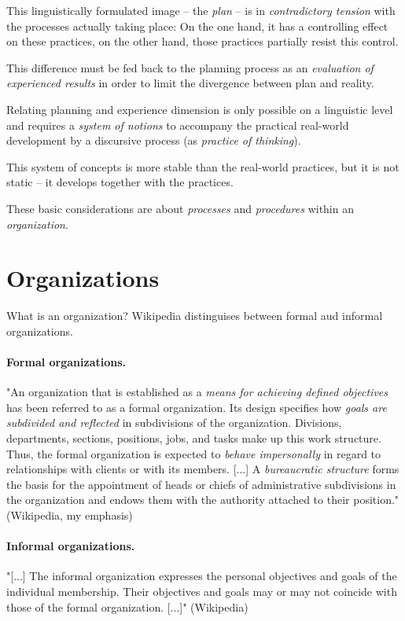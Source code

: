 \documentclass[11pt,a4paper]{article}
\begin{document}
This linguistically formulated image -- the \emph{plan} -- is in
\emph{contradictory tension} with the processes actually taking place: On the
one hand, it has a controlling effect on these practices, on the other hand,
those practices partially resist this control.\enlargethispage{1em}

This difference must be fed back to the planning process as an
\emph{evaluation of experienced results} in order to limit the divergence
between plan and reality.

Relating planning and experience dimension is only possible on a linguistic
level and requires a \emph{system of notions} to accompany the practical
real-world development by a discursive process (as \emph{practice of
  thinking}).

This system of concepts is more stable than the real-world practices, but it
is not static -- it develops together with the practices.

These basic considerations are about \emph{processes} and \emph{procedures}
within an \emph{organization}.

\section{Organizations}

What is an organization? Wikipedia distinguises between formal aud informal
organizations. 

\paragraph{Formal organizations.}
"An organization that is established as a \emph{means for achieving defined
  objectives} has been referred to as a formal organization. Its design
specifies how \emph{goals are subdivided and reflected} in subdivisions of the
organization. Divisions, departments, sections, positions, jobs, and tasks
make up this work structure. Thus, the formal organization is expected to
\emph{behave impersonally} in regard to relationships with clients or with its
members. [...] A \emph{bureaucratic structure} forms the basis for the
appointment of heads or chiefs of administrative subdivisions in the
organization and endows them with the authority attached to their position."
(Wikipedia, my emphasis)

\paragraph{Informal organizations.}
"[...] The informal organization expresses the personal objectives and goals
of the individual membership. Their objectives and goals may or may not
coincide with those of the formal organization. [...]" (Wikipedia)
\end{document}
